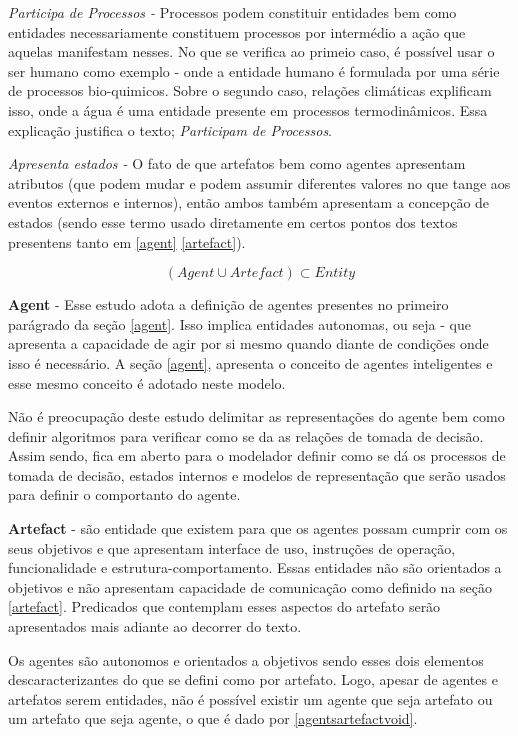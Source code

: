 \textit{Participa de Processos -} Processos podem constituir entidades bem como entidades necessariamente constituem 
processos por intermédio a ação que aquelas manifestam nesses. No que se verifica ao primeio caso, é possível usar o ser humano como exemplo - onde
a entidade humano é formulada por uma série de processos bio-quimicos. Sobre o segundo caso, relações climáticas explificam isso, onde a água é uma entidade
presente em processos termodinâmicos. Essa explicação justifica o texto; \textit{Participam de Processos}.  

\textit{Apresenta estados -} O fato de que artefatos bem como agentes apresentam atributos (que podem mudar e podem assumir diferentes valores no que tange aos eventos 
externos e internos), então ambos também apresentam a concepção de estados (sendo esse termo usado diretamente em certos pontos dos textos presentens 
tanto em \ref{agent} \ref{artefact}). 


\begin{equation} \label{defineentity} 
( Agent \cup Artefact ) \subset Entity
\end{equation}

\textbf{Agent} - Esse estudo adota a definição de agentes presentes no primeiro parágrado da seção \ref{agent}. Isso implica entidades autonomas, ou seja -
que apresenta a capacidade de agir por si mesmo quando diante de condições onde isso é necessário. A seção \ref{agent}, apresenta o conceito de agentes
inteligentes e esse mesmo conceito é adotado neste modelo. 

Não é preocupação deste estudo delimitar as representações do agente bem como definir algoritmos para verificar como se da as relações de tomada 
de decisão. Assim sendo, fica em aberto para o modelador definir como se dá os processos de tomada de decisão, estados internos e modelos de representação 
que serão usados para definir o comportanto do agente. 

\textbf{Artefact} - são entidade que existem para que os agentes possam cumprir com os seus objetivos e que apresentam interface de uso, instruções 
de operação, funcionalidade e estrutura-comportamento. Essas entidades não são orientados a objetivos e 
não apresentam capacidade de comunicação como definido na seção \ref{artefact}. Predicados que contemplam esses aspectos do artefato serão apresentados
mais adiante ao decorrer do texto. 

Os agentes são autonomos e orientados a objetivos sendo esses dois elementos descaracterizantes do que se defini como por artefato. Logo, apesar de agentes
e artefatos serem entidades, não é possível existir um agente que seja artefato ou um artefato que seja agente, o que é dado por \ref{agentsartefactvoid}. 

